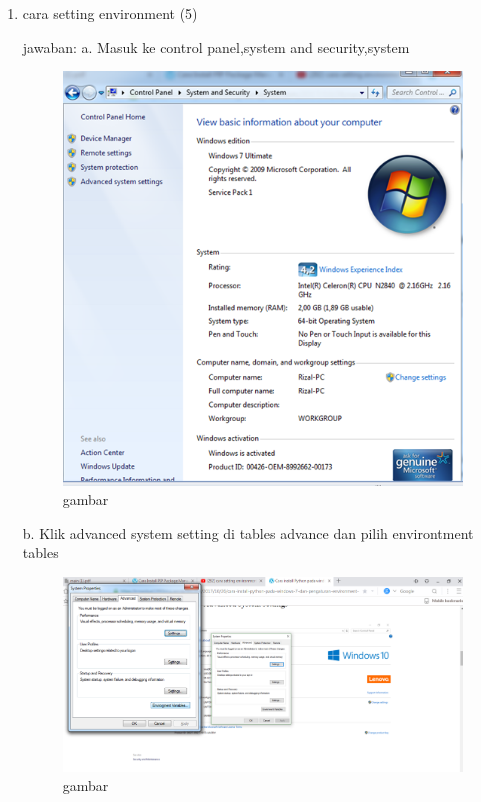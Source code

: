 \begin{enumerate}
\item
cara setting environment (5)

jawaban:
a.	Masuk ke control panel,system and security,system
    \begin{figure}
\begin{center} 
\includegraphics[scale=0.4]{src/soal3phyton1.PNG} 
\caption{gambar} 
\label{unhas} 
\end{center} 
\end{figure}

b.	Klik advanced system setting di tables advance dan pilih environtment tables
    \begin{figure}
\begin{center} 
\includegraphics[scale=0.4]{src/soal3phyton2.PNG} 
\caption{gambar} 
\label{unhas} 
\end{center} 
\end{figure}


\end{enumerate}
